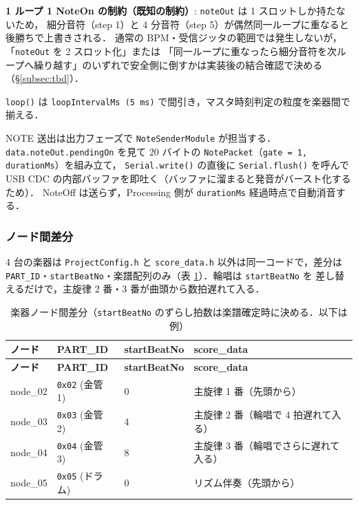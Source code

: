 \documentclass[lualatex,book,paper=a4paper,jafontsize=11.5pt,jafontscale=1.05]{jlreq}
\begin{document}
\textbf{1 ループ 1 NoteOn の制約（既知の制約）}: \texttt{noteOut} は 1 スロットしか持たないため，
細分音符（step 1）と 4 分音符（step 5）が偶然同一ループに重なると後勝ちで上書きされる．
通常の BPM・受信ジッタの範囲では発生しないが，「\texttt{noteOut} を 2 スロット化」または
「同一ループに重なったら細分音符を次ループへ繰り越す」のいずれで安全側に倒すかは実装後の結合確認で決める（\S\ref{subsec:tbd}）．

\texttt{loop()} は \texttt{loopIntervalMs (5 ms)} で間引き，マスタ時刻判定の粒度を楽器間で揃える．

NOTE 送出は出力フェーズで \texttt{NoteSenderModule} が担当する．
\texttt{data.noteOut.pendingOn} を見て 20 バイトの \texttt{NotePacket}（\texttt{gate = 1, durationMs}）を組み立て，
\texttt{Serial.write()} の直後に \texttt{Serial.flush()} を呼んで USB CDC の内部バッファを即吐く（バッファに溜まると発音がバースト化するため）．
NoteOff は送らず，Processing 側が \texttt{durationMs} 経過時点で自動消音する．

\subsubsection{ノード間差分}

4 台の楽器は \texttt{ProjectConfig.h} と \texttt{score\_data.h} 以外は同一コードで，差分は
\texttt{PART\_ID}・\texttt{startBeatNo}・楽譜配列のみ（表 \ref{tab:performer-diff}）．輪唱は \texttt{startBeatNo} を
差し替えるだけで，主旋律 2 番・3 番が曲頭から数拍遅れて入る．

\begin{longtable}{l l l p{}}
\caption{楽器ノード間差分（\texttt{startBeatNo} のずらし拍数は楽譜確定時に決める．以下は例）}\label{tab:performer-diff}\\
\toprule
\textbf{ノード} & \textbf{PART\_ID} & \textbf{startBeatNo} & \textbf{score\_data} \\
\midrule
\endfirsthead
\toprule
\textbf{ノード} & \textbf{PART\_ID} & \textbf{startBeatNo} & \textbf{score\_data} \\
\midrule
\endhead
node\_02 & \texttt{0x02} (金管 1) & 0  & 主旋律 1 番（先頭から） \\
node\_03 & \texttt{0x03} (金管 2) & 4  & 主旋律 2 番（輪唱で 4 拍遅れて入る） \\
node\_04 & \texttt{0x04} (金管 3) & 8  & 主旋律 3 番（輪唱でさらに遅れて入る） \\
node\_05 & \texttt{0x05} (ドラム) & 0  & リズム伴奏（先頭から） \\
\bottomrule
\end{longtable}
\end{document}
